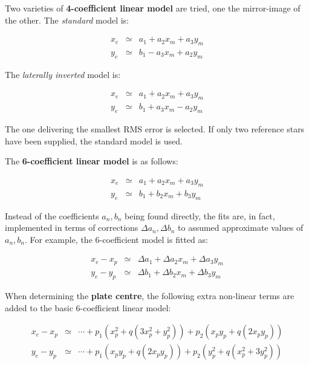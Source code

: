 \documentclass[twoside,11pt]{article}
\renewcommand{\_}{\texttt{\symbol{95}}}
\begin{document}
Two varieties of \textbf{4-coefficient linear model} are tried, one
the mirror-image of the other.  The \textit{standard} model is:

\begin{eqnarray*}
x_{e} & \simeq & a_{1} + a_{2} x_{m} + a_{3} y_{m} \\
y_{e} & \simeq & b_{1} - a_{3} x_{m} + a_{2} y_{m}
\end{eqnarray*}

The \textit{laterally inverted} model is:

\begin{eqnarray*}
x_{e} & \simeq & a_{1} + a_{2} x_{m} + a_{3} y_{m} \\
y_{e} & \simeq & b_{1} + a_{3} x_{m} - a_{2} y_{m}
\end{eqnarray*}

The one delivering the smallest RMS error is selected.  If only
two reference stars have been supplied, the standard model is
used.

The \textbf{6-coefficient linear model} is as follows:

\begin{eqnarray*}
x_{e} & \simeq & a_{1} + a_{2} x_{m} + a_{3} y_{m} \\
y_{e} & \simeq & b_{1} + b_{2} x_{m} + b_{3} y_{m}
\end{eqnarray*}

Instead of the coefficients $a_{n},b_{n}$ being found directly, the fits
are, in fact, implemented in terms of corrections $\Delta a_{n},\Delta
b_{n}$ to assumed approximate values of $a_{n},b_{n}$.  For example,
the 6-coefficient model is fitted as:

\begin{eqnarray*}
x_{e} - x_{p} & \simeq & \Delta a_{1}
          + \Delta a_{2} x_{m} + \Delta a_{3} y_{m} \\
y_{e} - y_{p} &\simeq & \Delta b_{1}
          + \Delta b_{2} x_{m} + \Delta b_{3} y_{m}
\end{eqnarray*}

When determining the \textbf{plate centre}, the following extra non-linear
terms are added to the basic 6-coefficient linear model:

\begin{eqnarray*}
x_{e} - x_{p} & \simeq & \cdots + p_{1} (x_{p}^{2} + q (3 x_{p}^{2} + y_{p}^{2}))
                    + p_{2} (x_{p}y_{p} + q (2 x_{p}y_{p})) \\
y_{e} - y_{p} & \simeq & \cdots + p_{1} (x_{p}y_{p} + q (2 x_{p}y_{p}))
                    + p_{2} (y_{p}^{2} + q (x_{p}^{2} + 3 y_{p}^{2}))
\end{eqnarray*}
\end{document}
